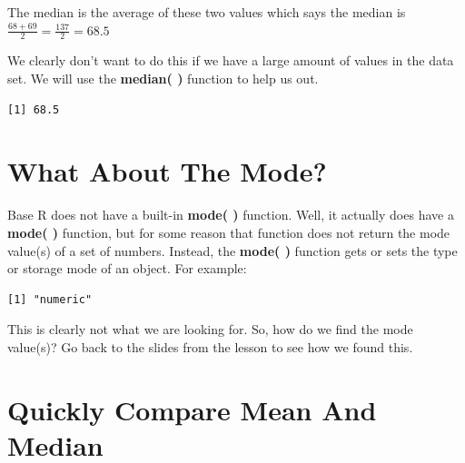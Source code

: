 \documentclass[
  letterpaper,
  DIV=11,
  numbers=noendperiod]{scrreprt}
\newenvironment{Shaded}{\begin{snugshade}}{\end{snugshade}}
\newcommand{\FunctionTok}[1]{\textcolor[rgb]{0.28,0.35,0.67}{#1}}
\newcommand{\NormalTok}[1]{\textcolor[rgb]{0.00,0.23,0.31}{#1}}
\newcommand{\SpecialCharTok}[1]{\textcolor[rgb]{0.37,0.37,0.37}{#1}}
\begin{document}
The median is the average of these two values which says the median is
\(\frac{68+69}{2} = \frac{137}{2} = 68.5\)

We clearly don't want to do this if we have a large amount of values in
the data set. We will use the \textbf{median( )} function to help us
out.

\begin{Shaded}
\end{Shaded}

\begin{verbatim}
[1] 68.5
\end{verbatim}

\section*{What About The Mode?}\label{what-about-the-mode}


Base R does not have a built-in \textbf{mode( )} function. Well, it
actually does have a \textbf{mode( )} function, but for some reason that
function does not return the mode value(s) of a set of numbers. Instead,
the \textbf{mode( )} function gets or sets the type or storage mode of
an object. For example:

\begin{Shaded}
\end{Shaded}

\begin{verbatim}
[1] "numeric"
\end{verbatim}

This is clearly not what we are looking for. So, how do we find the mode
value(s)? Go back to the slides from the lesson to see how we found
this.

\section*{Quickly Compare Mean And
Median}\label{quickly-compare-mean-and-median}
\end{document}
